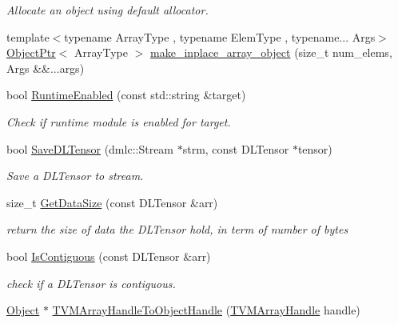 \begin{DoxyCompactItemize}
\begin{DoxyCompactList}\small\item\em Allocate an object using default allocator. \end{DoxyCompactList}\item 
{\footnotesize template$<$typename Array\+Type , typename Elem\+Type , typename... Args$>$ }\\\hyperlink{classtvm_1_1runtime_1_1ObjectPtr}{Object\+Ptr}$<$ Array\+Type $>$ \hyperlink{namespacetvm_1_1runtime_a144496aaff68cd251b6bc0a7b24ca041}{make\+\_\+inplace\+\_\+array\+\_\+object} (size\+\_\+t num\+\_\+elems, Args \&\&...args)
\item 
bool \hyperlink{namespacetvm_1_1runtime_abbea0c23882ae01431ac7fe6506b32a7}{Runtime\+Enabled} (const std\+::string \&target)
\begin{DoxyCompactList}\small\item\em Check if runtime module is enabled for target. \end{DoxyCompactList}\item 
bool \hyperlink{namespacetvm_1_1runtime_a8fb37910dcd9bb6899e6a3a47f006514}{Save\+D\+L\+Tensor} (dmlc\+::\+Stream $\ast$strm, const D\+L\+Tensor $\ast$tensor)
\begin{DoxyCompactList}\small\item\em Save a D\+L\+Tensor to stream. \end{DoxyCompactList}\item 
size\+\_\+t \hyperlink{namespacetvm_1_1runtime_a59940b6d63dd4c5175c0fe875047c1cf}{Get\+Data\+Size} (const D\+L\+Tensor \&arr)
\begin{DoxyCompactList}\small\item\em return the size of data the D\+L\+Tensor hold, in term of number of bytes \end{DoxyCompactList}\item 
bool \hyperlink{namespacetvm_1_1runtime_adb2ed1227b418f5846d43d3234b52391}{Is\+Contiguous} (const D\+L\+Tensor \&arr)
\begin{DoxyCompactList}\small\item\em check if a D\+L\+Tensor is contiguous. \end{DoxyCompactList}\item 
\hyperlink{classtvm_1_1runtime_1_1Object}{Object} $\ast$ \hyperlink{namespacetvm_1_1runtime_afdd7050eda88b079f0a962bd413a34ea}{T\+V\+M\+Array\+Handle\+To\+Object\+Handle} (\hyperlink{c__runtime__api_8h_a73ca58cb32f4a4adf71d274dc1e27be4}{T\+V\+M\+Array\+Handle} handle)
\item 

\end{DoxyCompactItemize}
